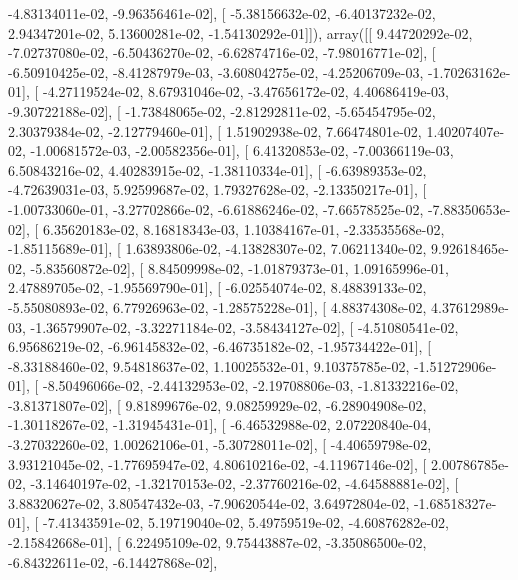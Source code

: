 \documentclass{article}
\begin{document}
         -4.83134011e-02,  -9.96356461e-02],
       [ -5.38156632e-02,  -6.40137232e-02,   2.94347201e-02,
          5.13600281e-02,  -1.54130292e-01]]), array([[  9.44720292e-02,  -7.02737080e-02,  -6.50436270e-02,
         -6.62874716e-02,  -7.98016771e-02],
       [ -6.50910425e-02,  -8.41287979e-03,  -3.60804275e-02,
         -4.25206709e-03,  -1.70263162e-01],
       [ -4.27119524e-02,   8.67931046e-02,  -3.47656172e-02,
          4.40686419e-03,  -9.30722188e-02],
       [ -1.73848065e-02,  -2.81292811e-02,  -5.65454795e-02,
          2.30379384e-02,  -2.12779460e-01],
       [  1.51902938e-02,   7.66474801e-02,   1.40207407e-02,
         -1.00681572e-03,  -2.00582356e-01],
       [  6.41320853e-02,  -7.00366119e-03,   6.50843216e-02,
          4.40283915e-02,  -1.38110334e-01],
       [ -6.63989353e-02,  -4.72639031e-03,   5.92599687e-02,
          1.79327628e-02,  -2.13350217e-01],
       [ -1.00733060e-01,  -3.27702866e-02,  -6.61886246e-02,
         -7.66578525e-02,  -7.88350653e-02],
       [  6.35620183e-02,   8.16818343e-03,   1.10384167e-01,
         -2.33535568e-02,  -1.85115689e-01],
       [  1.63893806e-02,  -4.13828307e-02,   7.06211340e-02,
          9.92618465e-02,  -5.83560872e-02],
       [  8.84509998e-02,  -1.01879373e-01,   1.09165996e-01,
          2.47889705e-02,  -1.95569790e-01],
       [ -6.02554074e-02,   8.48839133e-02,  -5.55080893e-02,
          6.77926963e-02,  -1.28575228e-01],
       [  4.88374308e-02,   4.37612989e-03,  -1.36579907e-02,
         -3.32271184e-02,  -3.58434127e-02],
       [ -4.51080541e-02,   6.95686219e-02,  -6.96145832e-02,
         -6.46735182e-02,  -1.95734422e-01],
       [ -8.33188460e-02,   9.54818637e-02,   1.10025532e-01,
          9.10375785e-02,  -1.51272906e-01],
       [ -8.50496066e-02,  -2.44132953e-02,  -2.19708806e-03,
         -1.81332216e-02,  -3.81371807e-02],
       [  9.81899676e-02,   9.08259929e-02,  -6.28904908e-02,
         -1.30118267e-02,  -1.31945431e-01],
       [ -6.46532988e-02,   2.07220840e-04,  -3.27032260e-02,
          1.00262106e-01,  -5.30728011e-02],
       [ -4.40659798e-02,   3.93121045e-02,  -1.77695947e-02,
          4.80610216e-02,  -4.11967146e-02],
       [  2.00786785e-02,  -3.14640197e-02,  -1.32170153e-02,
         -2.37760216e-02,  -4.64588881e-02],
       [  3.88320627e-02,   3.80547432e-03,  -7.90620544e-02,
          3.64972804e-02,  -1.68518327e-01],
       [ -7.41343591e-02,   5.19719040e-02,   5.49759519e-02,
         -4.60876282e-02,  -2.15842668e-01],
       [  6.22495109e-02,   9.75443887e-02,  -3.35086500e-02,
         -6.84322611e-02,  -6.14427868e-02],
\end{document}
